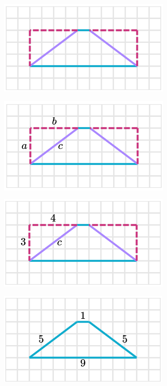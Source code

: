 \begin{solutionbox}{14cm}
    \begin{minipage}{0.3\textwidth}
        \begin{figure}[H]
            \centering
            \includegraphics[width=0.6\linewidth]{../images/peri_trap_03a.png}
            \caption{}
            \label{fig:peri_trap_03a}
        \end{figure}
        \begin{figure}[H]
            \centering
            \includegraphics[width=0.6\linewidth]{../images/peri_trap_03b.png}
            \caption{}
            \label{fig:peri_trap_03b}
        \end{figure}
        \begin{figure}[H]
            \centering
            \includegraphics[width=0.6\linewidth]{../images/peri_trap_03c.png}
            \caption{}
            \label{fig:peri_trap_03c}
        \end{figure}
        \begin{figure}[H]
            \centering
            \includegraphics[width=0.6\linewidth]{../images/peri_trap_03d.png}

\end{figure}
\end{minipage}
\end{solutionbox}
